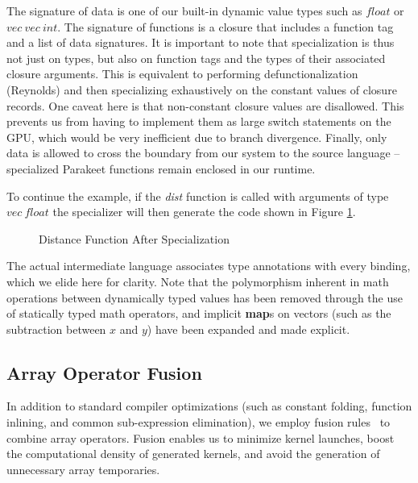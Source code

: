 \documentclass[preprint]{sigplanconf}
\begin{document}
The signature of data is one of our built-in dynamic value types such as $float$ or $vec~vec~int$.  The signature of functions is a closure that includes a function tag and a list of data signatures.  It is important to note that specialization is thus not just on types, but also on function tags and the types of their associated closure arguments. This is equivalent to performing defunctionalization (Reynolds) and
then specializing exhaustively on the constant values of closure records. One caveat here is that non-constant closure values are disallowed.  This prevents us from having to implement them as large switch statements on the GPU, which would be very inefficient due to branch divergence.  Finally, only data is
allowed to cross the boundary from our system to the source language -- specialized Parakeet functions remain enclosed in our runtime.

To continue the example, if the \textit{dist} function is called with arguments of type $vec~ float$ the specializer will then generate the code shown in Figure \ref{SpecDist}.

\begin{figure}[h!]
\caption{Distance Function After Specialization}
\label{SpecDist}
\end{figure}

The actual intermediate language associates type annotations with every binding, which we elide here for clarity. Note that the polymorphism inherent in math operations between dynamically typed values has been removed through the use of statically typed math operators, and implicit \textbf{map}s on vectors (such as the subtraction between $x$ and $y$) have been expanded and made explicit.


\subsection{Array Operator Fusion}
In addition to standard compiler optimizations (such as constant folding, function inlining, and common sub-expression elimination), we employ fusion rules~\cite{Jones01} to combine array operators. Fusion enables us to minimize kernel launches, boost the computational density of generated kernels, and avoid the generation of unnecessary array temporaries.
\end{document}
